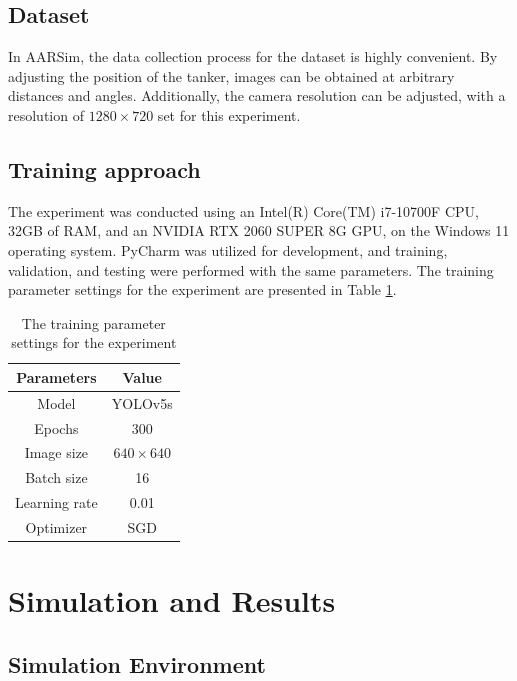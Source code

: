 \subsection{Dataset}
In AARSim, the data collection process for the dataset is highly convenient. By adjusting the position of the tanker, images can be obtained at arbitrary distances and angles. Additionally, the camera resolution can be adjusted, with a resolution of $1280 \times 720$ set for this experiment.

\subsection{Training approach}
The experiment was conducted using an Intel(R) Core(TM) i7-10700F CPU, 32GB of RAM, and an NVIDIA RTX 2060 SUPER 8G GPU, on the Windows 11 operating system. PyCharm was utilized for development, and training, validation, and testing were performed with the same parameters. The training parameter settings for the experiment are presented in Table \ref{tab_parameter}.

\begin{table}
	\caption{The training parameter settings for the experiment}
	
	\begin{centering}
		\begin{tabular}{|c|c|}
			\hline 
			Parameters & Value\tabularnewline
			\hline 
			Model & YOLOv5s\tabularnewline
			\hline 
			Epochs & 300\tabularnewline
			\hline 
			Image size & $640 \times 640$\tabularnewline
			\hline 
			Batch size & 16\tabularnewline
			\hline 
			Learning rate & 0.01\tabularnewline
			\hline 
			Optimizer & SGD\tabularnewline
			\hline 
		\end{tabular}
		\par\end{centering}
	\centering{}\label{tab_parameter}
\end{table}

\section{Simulation and Results}
\subsection{Simulation Environment}

